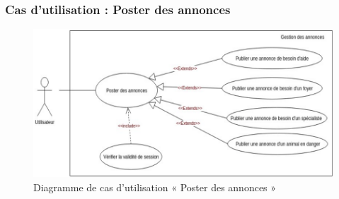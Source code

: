 \documentclass[11pt,a4paper,oneside]{book}
\begin{document}
		\subsubsection{Cas d’utilisation : Poster des annonces}
		\begin{figure}[H]
			\centering
			\includegraphics[width=1\textwidth]{Diagrammes/poster_annonces}
			\caption{Diagramme de cas d’utilisation « Poster des annonces »}
			\label{fig:posterannonces}
		\end{figure}
		
\end{document}
